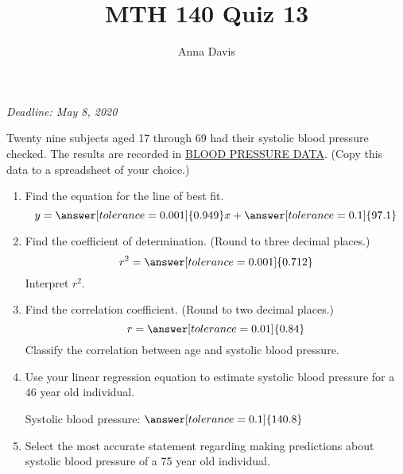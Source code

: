\documentclass{ximera}
\author{Anna Davis} \title{MTH 140 Quiz 13}
\begin{document}
\begin{abstract}

\end{abstract}
\maketitle
 \textit{Deadline: May 8, 2020}
\begin{problem}\label{prob:140quiz13prob1}
Twenty nine subjects aged 17 through 69 had their systolic blood pressure checked.  The results are recorded in \href{https://docs.google.com/spreadsheets/d/1v_i5UPj_IH2-d8QphkCZJiPbK0oV1fd0NAXmLnT8hnE/edit?usp=sharing}{BLOOD PRESSURE DATA}.  (Copy this data to a spreadsheet of your choice.)
\begin{enumerate}
    \item Find the equation for the line of best fit.
    $$y=\answer[tolerance=0.001]{0.949}x+\answer[tolerance=0.1]{97.1}$$
    \item Find the coefficient of determination. (Round to three decimal places.)
    $$r^2=\answer[tolerance=0.001]{0.712}$$
    Interpret $r^2$.
    \begin{multipleChoice} 
\end{multipleChoice} 
    \item Find the correlation coefficient.  (Round to two decimal places.)
    $$r=\answer[tolerance=0.01]{0.84}$$
    Classify the correlation between age and systolic blood pressure.
    
    \begin{multipleChoice} 
\end{multipleChoice}  
\item Use your linear regression equation to estimate systolic blood pressure for a 46 year old individual.  

Systolic blood pressure: $\answer[tolerance=0.1]{140.8}$
\item Select the most accurate statement regarding making predictions about systolic blood pressure of a 75 year old individual.
\begin{multipleChoice} 
\end{multipleChoice}  

\end{enumerate}
\end{problem}
\end{document}
